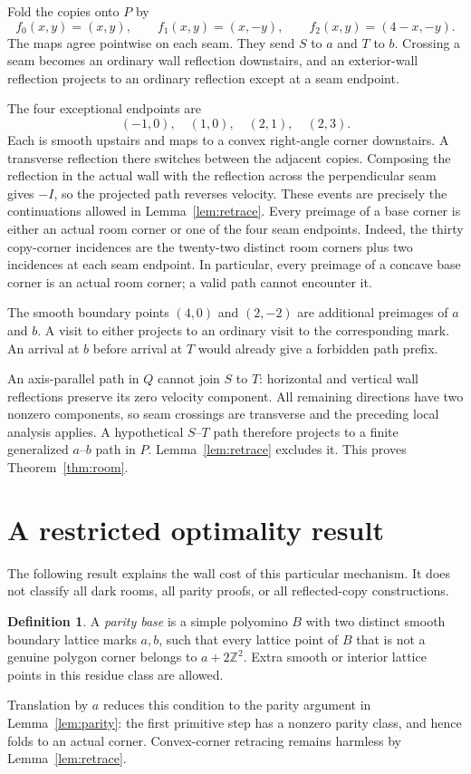 \documentclass[11pt]{article}
\theoremstyle{definition}\newtheorem{definition}[theorem]{Definition}
\begin{document}
Fold the copies onto $P$ by
\[
 f_0(x,y)=(x,y),\qquad f_1(x,y)=(x,-y),\qquad
 f_2(x,y)=(4-x,-y).
\]
The maps agree pointwise on each seam. They send $S$ to $a$ and $T$ to $b$. Crossing a seam becomes an ordinary wall reflection downstairs, and an exterior-wall reflection projects to an ordinary reflection except at a seam endpoint.

The four exceptional endpoints are
\[
(-1,0),\quad(1,0),\quad(2,1),\quad(2,3).
\]
Each is smooth upstairs and maps to a convex right-angle corner downstairs. A transverse reflection there switches between the adjacent copies. Composing the reflection in the actual wall with the reflection across the perpendicular seam gives $-I$, so the projected path reverses velocity. These events are precisely the continuations allowed in Lemma~\ref{lem:retrace}. Every preimage of a base corner is either an actual room corner or one of the four seam endpoints. Indeed, the thirty copy-corner incidences are the twenty-two distinct room corners plus two incidences at each seam endpoint. In particular, every preimage of a concave base corner is an actual room corner; a valid path cannot encounter it.

The smooth boundary points $(4,0)$ and $(2,-2)$ are additional preimages of $a$ and $b$. A visit to either projects to an ordinary visit to the corresponding mark. An arrival at $b$ before arrival at $T$ would already give a forbidden path prefix.

An axis-parallel path in $Q$ cannot join $S$ to $T$: horizontal and vertical wall reflections preserve its zero velocity component. All remaining directions have two nonzero components, so seam crossings are transverse and the preceding local analysis applies. A hypothetical $S$--$T$ path therefore projects to a finite generalized $a$--$b$ path in $P$. Lemma~\ref{lem:retrace} excludes it. This proves Theorem~\ref{thm:room}.

\section{A restricted optimality result}\label{sec:restricted}
The following result explains the wall cost of this particular mechanism. It does not classify all dark rooms, all parity proofs, or all reflected-copy constructions.

\begin{definition}
A \emph{parity base} is a simple polyomino $B$ with two distinct smooth boundary lattice marks $a,b$, such that every lattice point of $B$ that is not a genuine polygon corner belongs to $a+2\mathbb Z^2$. Extra smooth or interior lattice points in this residue class are allowed.
\end{definition}
Translation by $a$ reduces this condition to the parity argument in Lemma~\ref{lem:parity}: the first primitive step has a nonzero parity class, and hence folds to an actual corner. Convex-corner retracing remains harmless by Lemma~\ref{lem:retrace}.
\end{document}
